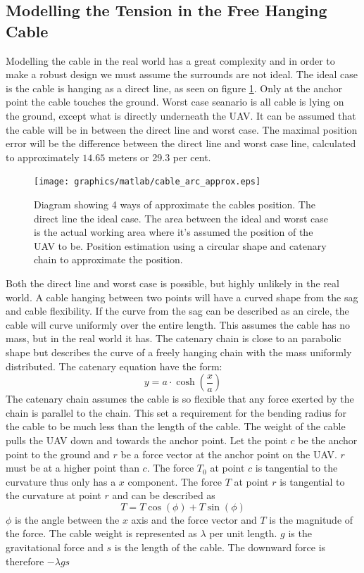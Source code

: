 \subsection{Modelling the Tension in the Free Hanging Cable}
Modelling the cable in the real world has a great complexity and in order to make a robust design we must assume the surrounds are not ideal. The ideal case is the cable is hanging as a direct line, as seen on figure \ref{fig:cable_model_cases}. Only at the anchor point the cable touches the ground. Worst case seanario is all cable is lying on the ground, except what is directly underneath the UAV. It can be assumed that the cable will be in between the direct line and worst case. The maximal position error will be the difference between the direct line and worst case line, calculated to approximately $14.65$ meters or 29.3 per cent. 

\begin{figure}[H]
\centering
\texttt{[image: graphics/matlab/cable\_arc\_approx.eps]}
\caption[Diagram showing 4 ways of approximate the cables position.]{Diagram showing 4 ways of approximate the cables position. The direct line the ideal case. The area between the ideal and worst case is the actual working area where it's assumed the position of the UAV to be. Position estimation using a circular shape and catenary chain to approximate the position.}
\label{fig:cable_model_cases}
\end{figure}

\noindent
Both the direct line and worst case is possible, but highly unlikely in the real world. A cable hanging between two points will have a curved shape from the sag and cable flexibility. If the curve from the sag can be described as an circle, the cable will curve uniformly over the entire length. This assumes the cable has no mass, but in the real world it has.
The catenary chain is close to an parabolic shape but describes the curve of a freely hanging chain with the mass uniformly distributed\cite{Whewelll1833}. The catenary equation have the form:
\begin{equation}
y = a \cdot \cosh\left(\frac{x}{a}\right)
\end{equation}
The catenary chain assumes the cable is so flexible that any force exerted by the chain is parallel to the chain. This set a requirement for the bending radius for the cable to be much less than the length of the cable.
The weight of the cable pulls the UAV down and towards the anchor point. Let the point $c$ be the anchor point to the ground and $r$ be a force vector at the anchor point on the UAV. $r$ must be at a higher point than $c$. The force $T_0$ at point $c$ is tangential to the curvature thus only has a $x$ component. The force $T$ at point $r$ is tangential to the curvature at point $r$ and can be described as
\begin{equation}
T = T \cos(\phi) +  T\sin(\phi)
\end{equation} 
$\phi$ is the angle between the $x$ axis and the force vector and $T$ is the magnitude of the force. The cable weight is represented as $\lambda$ per unit length. $g$ is the gravitational force and $s$ is the length of the cable. The downward force is therefore $-\lambda g s$

